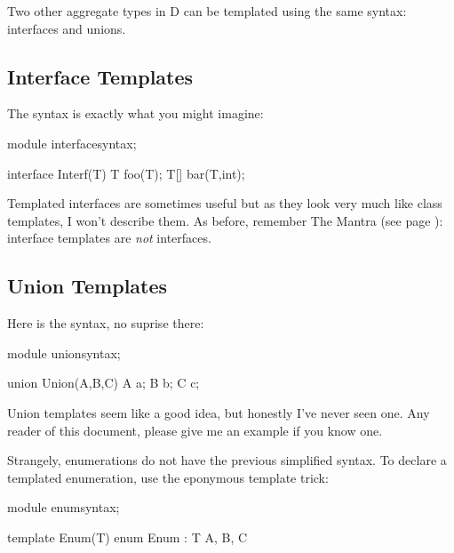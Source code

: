 Two other aggregate types in D can be templated using the same syntax: interfaces and unions.

\subsection{Interface Templates}

The syntax is exactly what you might imagine: 

\begin{dcode}
module interfacesyntax;

interface Interf(T)
{
    T foo(T);
    T[] bar(T,int);
}
\end{dcode}

Templated interfaces are sometimes useful but as they look very much like class templates, I won't describe them. As before, remember The Mantra (see page \pageref{mantra}): interface templates are \emph{not} interfaces.

\subsection{Union Templates}

Here is the syntax, no suprise there:

\begin{dcode}
module unionsyntax;

union Union(A,B,C) { A a; B b; C c;}
\end{dcode}

Union templates seem like a good idea, but honestly I've never seen one. Any reader of this document, please give me an example if you know one. 

Strangely, enumerations do not have the previous simplified syntax. To declare a templated enumeration, use the eponymous template trick:

\begin{dcode}
module enumsyntax;

template Enum(T)
{
    enum Enum : T { A, B, C}
}
\end{dcode}

